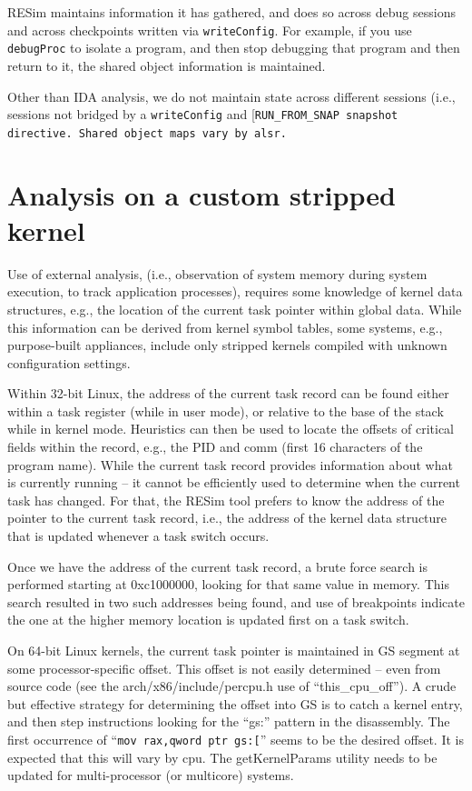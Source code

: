\documentclass[titlepage]{article}
\begin{document}
RESim maintains information it has gathered, and does so across debug sessions and across checkpoints written via {\tt writeConfig}.  For example, if you
use {\tt debugProc} to isolate a program, and then stop debugging that program and then return to it, the shared object information is maintained.

Other than IDA analysis, we do not maintain state across different sessions (i.e., sessions not bridged by a {\tt writeConfig} and [\tt RUN\_FROM\_SNAP snapshot directive.
Shared object maps vary by alsr.


\pagebreak
\appendix
\section{Analysis on a custom stripped kernel}
Use of external analysis, (i.e., observation of system memory during system execution, to track application processes), requires some knowledge of kernel data structures, e.g., the location of the current task pointer within global data.   While this information can be derived from kernel symbol tables, some systems, e.g., purpose-built appliances, include only stripped kernels compiled with unknown configuration settings.

Within 32-bit Linux, the address of the current task record can be found either within a task register (while in user mode), or relative to the base of the stack while in kernel mode.  Heuristics can then be used to locate the offsets of critical fields within the record, e.g., the PID and comm (first 16 characters of the program name).  While the current task record provides information about what is currently running – it cannot be efficiently used to determine when the current task has changed.  For that, the RESim tool prefers to know the address of the pointer to the current task record, i.e., the address of the kernel data structure that is updated whenever a task switch occurs.

Once we have the address of the current task record, a brute force search is performed starting at 0xc1000000, looking for that same value in memory.  This search resulted in two such addresses being found, and use of breakpoints indicate the one at the higher memory location is updated first on a task switch. 

On 64-bit Linux kernels, the current task pointer is maintained in GS segment at some processor-specific offset.  This offset is not easily determined – even from source code (see the arch/x86/include/percpu.h use of “this\_cpu\_off”).  A crude but effective strategy for determining the offset into GS is to catch a kernel entry, and then step instructions looking for the ``gs:'' pattern in the disassembly.  The first occurrence of ``{\tt mov rax,qword ptr gs:[}''  seems to be the desired offset.  It is expected that this will vary by cpu. The getKernelParams utility needs to be updated for multi-processor (or multicore) systems.
\end{document}
